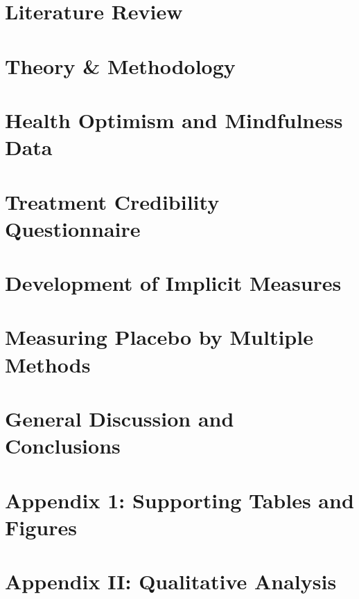 \documentclass[apsych,phd,final]{uccthesis}
\begin{document}
\label{cha:intr-rese}


\chapter{Literature Review}
\label{cha:literature-review}


\chapter{Theory \& Methodology}
\label{cha:methodology}


\chapter{Health Optimism and Mindfulness Data}
\label{cha:health-for-thesis}


\chapter{Treatment Credibility Questionnaire}
\label{cha:tcq-thesis}


\chapter{Development of Implicit Measures}
\label{cha:devel-impl-meas}



\chapter{Measuring Placebo by Multiple Methods}
\label{cha:primary-research}


\chapter{General Discussion and Conclusions}
\label{cha:general-discussion}

\appendix
\chapter{Appendix 1: Supporting Tables and Figures}
\label{cha:append-1:-supp}


\chapter{Appendix II: Qualitative Analysis}
\label{cha:append-ii:-qual}




\end{document}
